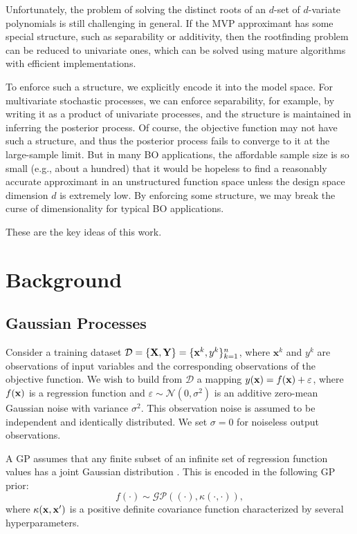 \documentclass{article}
\begin{document}
Unfortunately, the problem of solving the distinct roots of an $d$-set
of $d$-variate polynomials is still challenging in general. If the MVP
approximant has some special structure, such as separability or
additivity, then the rootfinding problem can be reduced to univariate
ones, which can be solved using mature algorithms with efficient
implementations.

To enforce such a structure, we explicitly encode it into the model
space. For multivariate stochastic processes, we can enforce
separability, for example, by writing it as a product of univariate
processes, and the structure is maintained in inferring the posterior
process. Of course, the objective function may not have such a
structure, and thus the posterior process fails to converge to it at the
large-sample limit. But in many BO applications, the affordable sample
size is so small (e.g., about a hundred) that it would be hopeless to
find a reasonably accurate approximant in an unstructured function space
unless the design space dimension $d$ is extremely low. By enforcing
some structure, we may break the curse of dimensionality for typical BO
applications.

These are the key ideas of this work.

\section{Background}

\subsection{Gaussian Processes}

Consider a training dataset $\mathcal{D}=\left\{ {\bf X},{\bf Y}\right\}=\{{\bf x}^k,y^k\}_{k=1}^n$, where $\textbf{x}^k$ and $y^k$ are observations of input variables and the corresponding observations of the objective function.
We wish to build from $\mathcal{D}$ a mapping $y({\bf x})=f({\bf x}) + \varepsilon$, where $f({\bf x})$ is a regression function and $\varepsilon \sim \mathcal{N}(0,\sigma^2)$  is an additive zero-mean Gaussian noise with variance $\sigma^2$.
This observation noise is assumed to be independent and identically distributed. We set $\sigma = 0$ for noiseless output observations.

A GP assumes that any finite subset of an infinite set of regression function values has a joint Gaussian distribution \cite{Rasmussen2006}.
This is encoded in the following GP prior:
%
\begin{equation}\label{eqn1}
	f(\cdot) \sim \mathcal{GP} \left((\cdot),\kappa(\cdot,\cdot)\right),
\end{equation}
where $\kappa({\bf x},{\bf x}')$ is a positive definite covariance function characterized by several hyperparameters.
\end{document}
